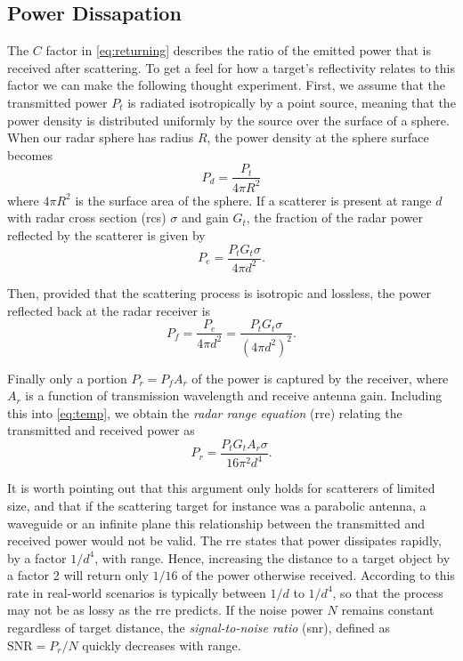 \subsection{Power Dissapation}

The $C$ factor in \eqref{eq:returning} describes the ratio of the emitted power that is received after scattering. To get a feel for how a target's reflectivity relates to this factor we can make the following thought experiment. First, we assume that the transmitted power $P_t$ is radiated isotropically by a point source, meaning that the power density is distributed uniformly by the source over the surface of a sphere. When our radar sphere has radius $R$, the power density at the sphere surface becomes  \citep{amin_2017}
\begin{equation}
	P_d 
	= \frac{P_t}{4\pi R^2}
\end{equation}
where $4\pi R^2$ is the surface area of the sphere. If a scatterer is present at range $d$ with radar cross section (\gls{rcs}) $\sigma$ and gain $G_t$, the fraction of the radar power reflected by the scatterer is given by 
\begin{equation}
	P_{e}
	= \frac{P_tG_t\sigma}{4\pi d^2}.
\end{equation}

Then, provided that the scattering process is isotropic and lossless, the power reflected back at the radar receiver is
\begin{equation}\label{eq:temp}
	P_f 
	= \frac{P_e}{4\pi d^2} 
	= \frac{P_t G_t \sigma}{(4\pi d^2)^2}.
\end{equation}

Finally only a portion $P_r = P_fA_r$ of the power is captured by the receiver, where $A_r$ is a function of transmission wavelength and receive antenna gain. Including this into \eqref{eq:temp}, we obtain the \emph{radar range equation} (\gls{rre}) relating the transmitted and received power as
\begin{equation}
	P_r
	= \frac{P_t G_t A_r \sigma}{16\pi^2 d^4}.
\end{equation}

It is worth pointing out that this argument only holds for scatterers of limited size, and that if the scattering target for instance was a parabolic antenna, a waveguide or an infinite plane this relationship between the transmitted and received power would not be valid. The \gls{rre} states that power dissipates rapidly, by a factor $1/d^4$, with range. Hence, increasing the distance to a target object by a factor 2 will return only $1/16$ of the power otherwise received. According to \citep{richards_2014} this rate in real-world scenarios is typically between $1/d$ to $1/d^4$, so that the process may not be as lossy as the \gls{rre} predicts. If the noise power $N$ remains constant regardless of target distance, the \emph{signal-to-noise ratio} (\gls{snr}), defined as $\text{SNR} = P_r/N$ quickly decreases with range. 

